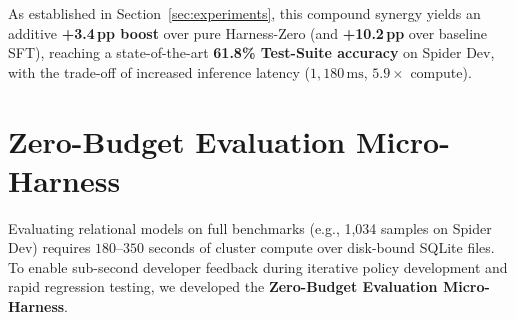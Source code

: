 \documentclass{article}
\theoremstyle{plain}
\theoremstyle{definition}
\theoremstyle{remark}
\begin{document}
As established in Section~\ref{sec:experiments}, this compound synergy yields an additive \textbf{+3.4\,pp boost} over pure Harness-Zero (and \textbf{+10.2\,pp} over baseline SFT), reaching a state-of-the-art \textbf{61.8\% Test-Suite accuracy} on Spider Dev, with the trade-off of increased inference latency ($1{,}180\,\text{ms}$, $5.9\times$ compute).

\section{Zero-Budget Evaluation Micro-Harness}
\label{sec:zero_budget}

Evaluating relational models on full benchmarks (e.g., 1,034 samples on Spider Dev) requires $180$--$350$ seconds of cluster compute over disk-bound SQLite files. To enable sub-second developer feedback during iterative policy development and rapid regression testing, we developed the \textbf{Zero-Budget Evaluation Micro-Harness}.

\begin{table}[t]
\centering
\small
\caption{\textbf{Validation and Diagnostic Fidelity Profiling of the Zero-Budget Evaluation Micro-Harness.} Evaluated across $N=35$ dual-mutation in-memory relational fixtures.}
\label{tab:zero_budget_gates}
\vskip 0.1in
\end{table}
\end{document}
